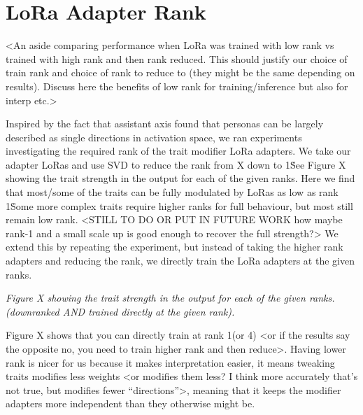 \section{LoRa Adapter Rank}\label{sec:appendix-g}

<An aside comparing performance when LoRa was trained with low rank vs trained with high rank and then rank reduced. This should justify our choice of train rank and choice of rank to reduce to (they might be the same depending on results). Discuss here the benefits of low rank for training/inference but also for interp etc.>

Inspired by the fact that assistant axis found that personas can be largely described as single directions in activation space, we ran experiments investigating the required rank of the trait modifier LoRa adapters. We take our adapter LoRas and use SVD to reduce the rank from X down to 1\. See Figure X showing the trait strength in the output for each of the given ranks. Here we find that most/some of the traits can be fully modulated by LoRas as low as rank 1\. Some more complex traits require higher ranks for full behaviour, but most still remain low rank. <STILL TO DO OR PUT IN FUTURE WORK how maybe rank-1 and a small scale up is good enough to recover the full strength?> We extend this by repeating the experiment, but instead of taking the higher rank adapters and reducing the rank, we directly train the LoRa adapters at the given ranks.

\textit{Figure X showing the trait strength in the output for each of the given ranks. (downranked AND trained directly at the given rank).}

Figure X shows that you can directly train at rank 1(or 4) <or if the results say the opposite no, you need to train higher rank and then reduce>. Having lower rank is nicer for us because it makes interpretation easier, it means tweaking traits modifies less weights <or modifies them less? I think more accurately that’s not true, but modifies fewer “directions”>, meaning that it keeps the modifier adapters more independent than they otherwise might be.


